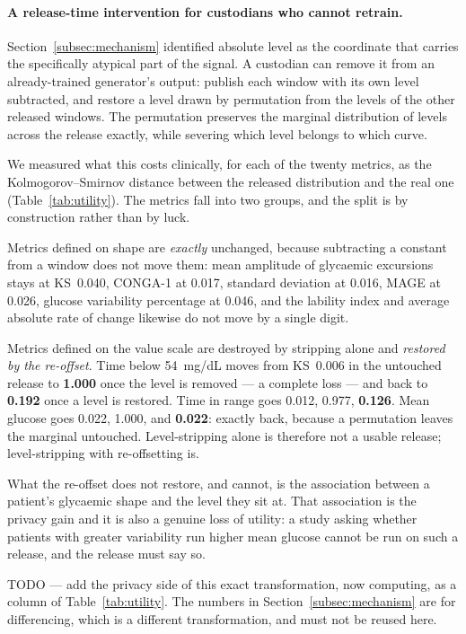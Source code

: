 \documentclass[pdflatex,sn-nature]{sn-jnl}
\theoremstyle{thmstyleone}
\begin{document}
\paragraph{A release-time intervention for custodians who cannot retrain.}
Section~\ref{subsec:mechanism} identified absolute level as the coordinate that
carries the specifically atypical part of the signal. A custodian can remove it
from an already-trained generator's output: publish each window with its own
level subtracted, and restore a level drawn by permutation from the levels of
the other released windows. The permutation preserves the marginal distribution
of levels across the release exactly, while severing which level belongs to
which curve.

We measured what this costs clinically, for each of the twenty metrics, as the
Kolmogorov--Smirnov distance between the released distribution and the real one
(Table~\ref{tab:utility}). The metrics fall into two groups, and the split is by
construction rather than by luck.

Metrics defined on shape are \emph{exactly} unchanged, because subtracting a
constant from a window does not move them: mean amplitude of glycaemic
excursions stays at \mbox{KS 0.040}, CONGA-1 at 0.017, standard deviation at
0.016, MAGE at 0.026, glucose variability percentage at 0.046, and the lability
index and average absolute rate of change likewise do not move by a single
digit.

Metrics defined on the value scale are destroyed by stripping alone and
\emph{restored by the re-offset}. Time below \mbox{54 mg/dL} moves from
\mbox{KS 0.006} in the untouched release to \textbf{1.000} once the level is
removed --- a complete loss --- and back to \textbf{0.192} once a level is
restored. Time in range goes 0.012, 0.977, \textbf{0.126}. Mean glucose goes
0.022, 1.000, and \textbf{0.022}: exactly back, because a permutation leaves the
marginal untouched. Level-stripping alone is therefore not a usable release;
level-stripping with re-offsetting is.

What the re-offset does not restore, and cannot, is the association between a
patient's glycaemic shape and the level they sit at. That association is the
privacy gain and it is also a genuine loss of utility: a study asking whether
patients with greater variability run higher mean glucose cannot be run on such
a release, and the release must say so.

TODO --- add the privacy side of this exact transformation, now computing, as a
column of Table~\ref{tab:utility}. The numbers in
Section~\ref{subsec:mechanism} are for differencing, which is a different
transformation, and must not be reused here.
\end{document}
